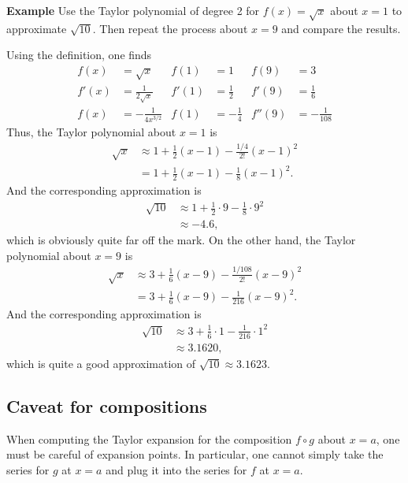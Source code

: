 \documentclass[twoside,openright,titlepage,a4paper]{book}
\begin{document}
\begin{sloppypar}
\textbf{Example} Use the Taylor polynomial of degree 2 for $f(x) = \sqrt{x}$ about $x=1$ to approximate $\sqrt{10}$. Then repeat the process about $x=9$ and compare the results. 
\begin{examplebox}
Using the definition, one finds
\begin{align*}
f(x) &= \sqrt{x} & f(1) &= 1 & f(9) &= 3 \\
f'(x) &= \frac{1}{2\sqrt{x}} & f'(1) &= \frac{1}{2} & f'(9) &= \frac{1}{6} \\
f(x) &= -\frac{1}{4x^{3/2}} & f(1) &= -\frac{1}{4} & f''(9) &= -\frac{1}{108} 
\end{align*}
Thus, the Taylor polynomial about $x=1$ is
\begin{align*}
\sqrt{x} & \approx 1 + \frac{1}{2}(x-1) - \frac{1/4}{2!}(x-1)^2 \\
&= 1 + \frac{1}{2}(x-1) - \frac{1}{8}(x-1)^2.
\end{align*}
And the corresponding approximation is
\begin{align*} 
\sqrt{10} &\approx 1 + \frac{1}{2}\cdot 9 - \frac{1}{8} \cdot 9^2 \\
&\approx -4.6, 
\end{align*}
which is obviously quite far off the mark. On the other hand, the Taylor polynomial about $x=9$ is
\begin{align*}
\sqrt{x} & \approx 3 + \frac{1}{6}(x-9) - \frac{1/{108}}{2!}(x-9)^2 \\
&= 3 + \frac{1}{6}(x-9) - \frac{1}{216}(x-9)^2.
\end{align*}
And the corresponding approximation is
\begin{align*}
\sqrt{10} &\approx 3 + \frac{1}{6}\cdot 1 - \frac{1}{216} \cdot 1^2 \\
&\approx 3.1620, 
\end{align*}
which is quite a good approximation of $\sqrt{10}\approx 3.1623$.
\end{examplebox}

\subsection{Caveat for compositions}

When computing the Taylor expansion for the composition $f \circ g$ about $x=a$, one must be careful of expansion points. In particular, one cannot simply take the series for $g$ at $x=a$ and plug it into the series for $f$ at $x=a$.


\end{sloppypar}
\end{document}
